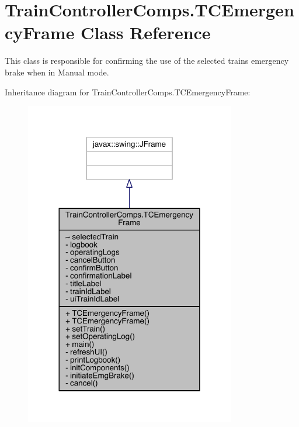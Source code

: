 \hypertarget{classTrainControllerComps_1_1TCEmergencyFrame}{}\section{Train\+Controller\+Comps.\+T\+C\+Emergency\+Frame Class Reference}
\label{classTrainControllerComps_1_1TCEmergencyFrame}


This class is responsible for confirming the use of the selected trains emergency brake when in Manual mode.  




Inheritance diagram for Train\+Controller\+Comps.\+T\+C\+Emergency\+Frame\+:
\nopagebreak
\begin{figure}[H]
\begin{center}
\leavevmode
\includegraphics[width=260pt]{classTrainControllerComps_1_1TCEmergencyFrame__inherit__graph}
\end{center}
\end{figure}


